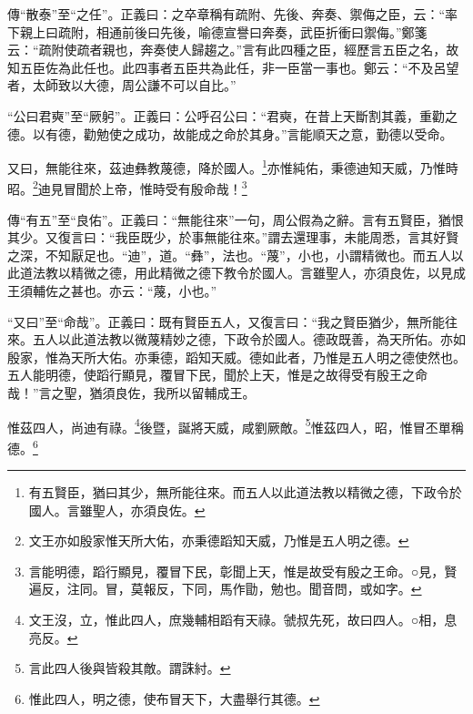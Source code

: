 {\noindent\zhuan{}\fzbyks 傳“散泰”至“之任”。正義曰：之卒章稱有疏附、先後、奔奏、禦侮之臣，云：“率下親上曰疏附，相通前後曰先後，喻德宣譽曰奔奏，武臣折衝曰禦侮。”鄭箋云：“疏附使疏者親也，奔奏使人歸趨之。”言有此四種之臣，經歷言五臣之名，故知五臣佐為此任也。此四事者五臣共為此任，非一臣當一事也。鄭云：“不及呂望者，太師致以大德，周公謙不可以自比。” \par}

{\noindent\shu{}\fzkt “公曰君奭”至“厥躬”。正義曰：公呼召公曰：“君奭，在昔上天斷割其義，重勸之德。以有德，勸勉使之成功，故能成之命於其身。”言能順天之意，勤德以受命。 \par}

又曰，無能往來，茲迪彝教蔑德，降於國人。\footnote{有五賢臣，猶曰其少，無所能往來。而五人以此道法教以精微之德，下政令於國人。言雖聖人，亦須良佐。}亦惟純佑，秉德迪知天威，乃惟時昭。\footnote{文王亦如殷家惟天所大佑，亦秉德蹈知天威，乃惟是五人明之德。}迪見冒聞於上帝，惟時受有殷命哉！\footnote{言能明德，蹈行顯見，覆冒下民，彰聞上天，惟是故受有殷之王命。○見，賢遍反，注同。冒，莫報反，下同，馬作勖，勉也。聞音問，或如字。}


{\noindent\zhuan{}\fzbyks 傳“有五”至“良佑”。正義曰：“無能往來”一句，周公假為之辭。言有五賢臣，猶恨其少。又復言曰：“我臣既少，於事無能往來。”謂去還理事，未能周悉，言其好賢之深，不知厭足也。“迪”，道。“彝”，法也。“蔑”，小也，小謂精微也。而五人以此道法教以精微之德，用此精微之德下教令於國人。言雖聖人，亦須良佐，以見成王須輔佐之甚也。亦云：“蔑，小也。” \par}

{\noindent\shu{}\fzkt “又曰”至“命哉”。正義曰：既有賢臣五人，又復言曰：“我之賢臣猶少，無所能往來。五人以此道法教以微蔑精妙之德，下政令於國人。德政既善，為天所佑。亦如殷家，惟為天所大佑。亦秉德，蹈知天威。德如此者，乃惟是五人明之德使然也。五人能明德，使蹈行顯見，覆冒下民，聞於上天，惟是之故得受有殷王之命哉！”言之聖，猶須良佐，我所以留輔成王。 \par}

惟茲四人，尚迪有祿。\footnote{文王沒，立，惟此四人，庶幾輔相蹈有天祿。虢叔先死，故曰四人。○相，息亮反。}後暨，誕將天威，咸劉厥敵。\footnote{言此四人後與皆殺其敵。謂誅紂。}惟茲四人，昭，惟冒丕單稱德。\footnote{惟此四人，明之德，使布冒天下，大盡舉行其德。}


